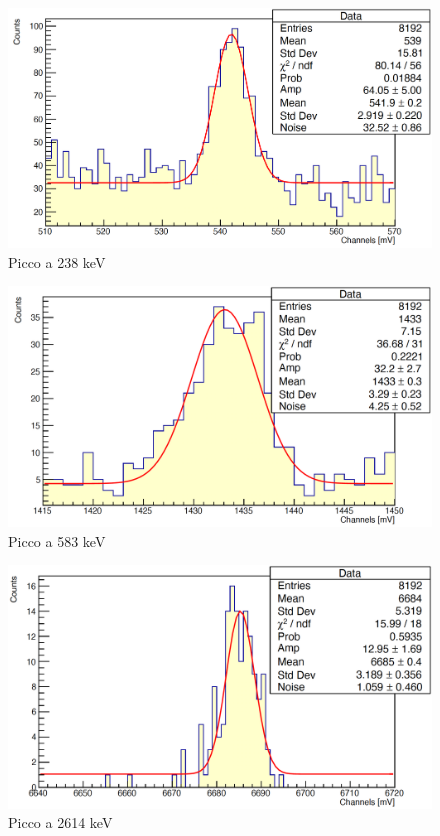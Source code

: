 \documentclass[a4paper,10pt]{article}
\begin{document}
\begin{figure}[H]
    \centering
    \includegraphics[scale=0.45]{appendice/spettri/ThA1_12}
    \caption{Picco a 238 keV}
\end{figure}
\begin{figure}[H]
    \centering
    \includegraphics[scale=0.45]{appendice/spettri/ThA2_12}
    \caption{Picco a 583 keV}
\end{figure}
\begin{figure}[H]
    \centering
    \includegraphics[scale=0.45]{appendice/spettri/ThA3_12}
    \caption{Picco a 2614 keV}
\end{figure}
\end{document}
